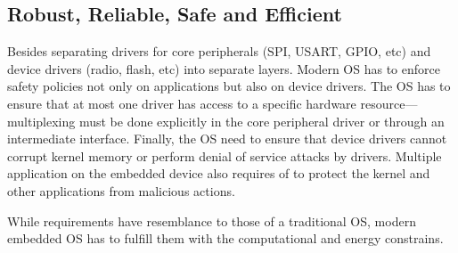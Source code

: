 \subsection{Robust, Reliable, Safe and Efficient}
Besides separating drivers for core peripherals (SPI, USART, GPIO, etc) and
device drivers (radio, flash, etc) into separate layers. Modern OS has to
enforce safety policies not only on applications but also on device drivers. The
OS has to ensure that at most one driver has access to a specific hardware
 resource---multiplexing must be done explicitly in the core peripheral driver
 or through an intermediate interface. Finally, the OS need to ensure that
 device drivers cannot corrupt kernel memory or perform denial of service
 attacks by drivers. Multiple application on the embedded device also requires
 of to protect the kernel and other applications from malicious actions.

While requirements have resemblance to those of a traditional OS, modern
embedded OS has to fulfill them with the computational and energy constrains. 






